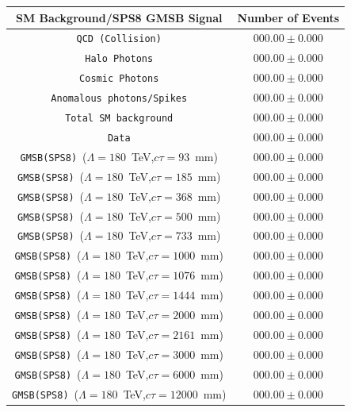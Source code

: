\begin{center}
\centering
\begin{tabular}{c c}
\hline
\bfseries{SM Background/SPS8 GMSB Signal} & \bfseries {Number of Events}\\
\hline
\texttt{QCD~(Collision)}  & $000.00 \pm 0.000$\\
\texttt{Halo Photons}  & $000.00 \pm 0.000$ \\
\texttt{Cosmic Photons} & $000.00 \pm 0.000$ \\
\texttt{Anomalous photons/Spikes} & $000.00 \pm 0.000$\\
\texttt{Total SM background} & $000.00 \pm 0.000$ \\
\hline \hline
\texttt{Data} & $000.00 \pm 0.000$ \\
\hline 
\texttt{GMSB(SPS8)}~($\Lambda=180$~TeV,$c\tau=93$~mm) & $000.00 \pm 0.000$ \\
\texttt{GMSB(SPS8)}~($\Lambda=180$~TeV,$c\tau=185$~mm) & $000.00 \pm 0.000$ \\
\texttt{GMSB(SPS8)}~($\Lambda=180$~TeV,$c\tau=368$~mm) & $000.00 \pm 0.000$ \\
\texttt{GMSB(SPS8)}~($\Lambda=180$~TeV,$c\tau=500$~mm) & $000.00 \pm 0.000$ \\
\texttt{GMSB(SPS8)}~($\Lambda=180$~TeV,$c\tau=733$~mm) & $000.00 \pm 0.000$ \\
\texttt{GMSB(SPS8)}~($\Lambda=180$~TeV,$c\tau=1000$~mm) & $000.00 \pm 0.000$ \\
\texttt{GMSB(SPS8)}~($\Lambda=180$~TeV,$c\tau=1076$~mm) & $000.00 \pm 0.000$ \\
\texttt{GMSB(SPS8)}~($\Lambda=180$~TeV,$c\tau=1444$~mm) & $000.00 \pm 0.000$ \\
\texttt{GMSB(SPS8)}~($\Lambda=180$~TeV,$c\tau=2000$~mm) & $000.00 \pm 0.000$ \\
\texttt{GMSB(SPS8)}~($\Lambda=180$~TeV,$c\tau=2161$~mm) & $000.00 \pm 0.000$ \\
\texttt{GMSB(SPS8)}~($\Lambda=180$~TeV,$c\tau=3000$~mm) & $000.00 \pm 0.000$ \\
\texttt{GMSB(SPS8)}~($\Lambda=180$~TeV,$c\tau=6000$~mm) & $000.00 \pm 0.000$ \\
\texttt{GMSB(SPS8)}~($\Lambda=180$~TeV,$c\tau=12000$~mm) & $000.00 \pm 0.000$ \\
\hline \hline
\end{tabular}
\label{tab:RESULT}
\end{center}




